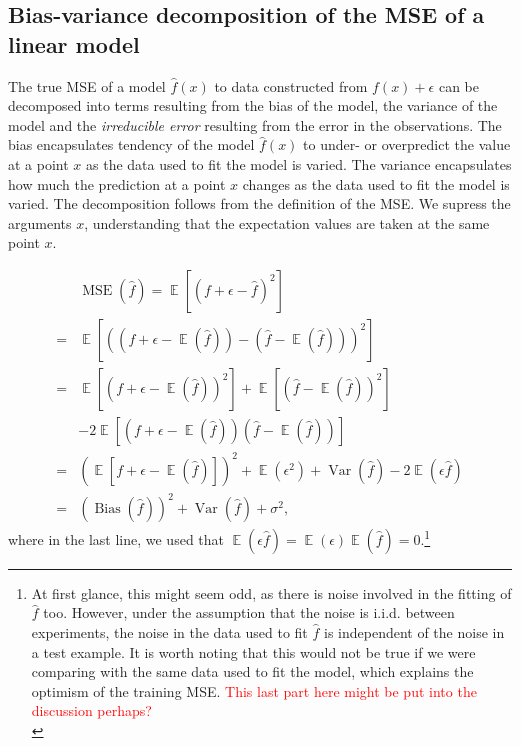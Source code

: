 \documentclass[twocolumn,english,notitlepage]{article}
\newcommand{\comment}[1]{\textcolor{red}{#1}\\}
\newcommand{\pclosed}[1]{\left(#1\right)}
\newcommand{\bclosed}[1]{\left[#1\right]}
\renewcommand{\expval}{\operatorname{\mathbb{E}}}
\renewcommand{\var}{\operatorname{Var}}
\newcommand{\bias}{\operatorname{Bias}}
\begin{document}
\begin{appendices}
    \section{Bias-variance decomposition of the MSE of a linear model} \label{app:sec:bvdecomp}
        The true MSE of a model $\hat{f}(x)$ to data constructed from $f(x) + \epsilon$ can be decomposed into terms resulting from the bias of the model, the variance of the model and the \textit{irreducible error} resulting from the error in the observations. The bias encapsulates tendency of the model $\hat{f}(x)$ to under- or overpredict the value at a point $x$ as the data used to fit the model is varied. The variance encapsulates how much the prediction at a point $x$ changes as the data used to fit the model is varied. The decomposition follows from the definition of the MSE. We supress the arguments $x$, understanding that the expectation values are taken at the same point $x$.

        \begin{align} \nonumber
            &\operatorname{MSE}(\hat{f}) = \expval\bclosed{(f+\epsilon-\hat{f})^2} \\ \nonumber
            =& \expval\bclosed{\pclosed{(f+\epsilon-\expval(\hat{f}))- (\hat{f}-\expval(\hat{f}))}^2} \\ \nonumber
            =& \expval\bclosed{\pclosed{f+\epsilon-\expval(\hat{f})}^2} + \expval\bclosed{\pclosed{\hat{f}-\expval(\hat{f})}^2} \\ \nonumber
            &-2 \expval\bclosed{ (f+\epsilon-\expval(\hat{f})) (\hat{f}-\expval(\hat{f})) } \\ \nonumber
            =& \pclosed{\expval\bclosed{f+\epsilon-\expval(\hat{f})}}^2 + \expval(\epsilon^2) + \var(\hat{f}) - 2\expval(\epsilon \hat{f}) \\
            =& \pclosed{\bias(\hat{f})}^2 + \var(\hat{f}) + \sigma^2,
        \end{align}
        where in the last line, we used that $\expval(\epsilon\hat{f}) = \expval(\epsilon)\expval(\hat{f})=0$.\footnote{At first glance, this might seem odd, as there is noise involved in the fitting of $\hat{f}$ too. However, under the assumption that the noise is i.i.d. between experiments, the noise in the data used to fit $\hat{f}$ is independent of the noise in a test example. It is worth noting that this would not be true if we were comparing with the same data used to fit the model, which explains the optimism of the training MSE. \comment{This last part here might be put into the discussion perhaps?}}


\end{appendices}
\end{document}
